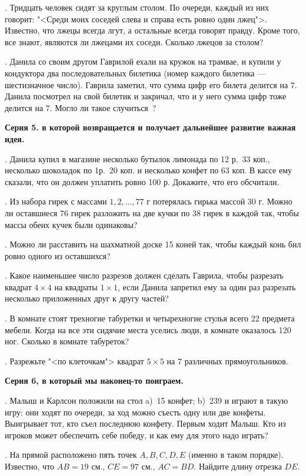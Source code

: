 . Тридцать человек сидят за круглым столом. По очереди, каждый из них говорит: "<Среди моих соседей слева и справа есть ровно один лжец">. 
Известно, что лжецы всегда лгут, а остальные всегда говорят правду. Кроме того, все знают, являются ли лжецами их соседи. 
Сколько лжецов за столом? 

. Данила со своим другом Гаврилой ехали на кружок на трамвае, и купили у
кондуктора два последовательных билетика (номер каждого билетика ---
шестизначное число). Гаврила заметил, что сумма цифр его билета делится на 7.
Данила посмотрел на свой билетик и закричал, что и у него сумма цифр тоже
делится на 7. Могло ли такое случиться~?

\centerline{\bf Серия 5. в которой возвращается и получает дальнейшее развитие 
важная идея.}

. Данила купил в магазине несколько бутылок лимонада по
12 р.~33 коп., несколько шоколадок по 1р.~20 коп. и несколько конфет по
63 коп.  В кассе ему сказали, что он должен уплатить ровно
100 р. Докажите, что его обсчитали.

. Из набора гирек с массами $1, 2, \ldots , 77$ г потерялась гирька
массой 30 г. Можно ли оставшиеся 76 гирек разложить на две кучки
по 38 гирек в каждой так, чтобы массы обеих кучек были одинаковы?

. Можно ли расставить на шахматной доске 15 коней так, чтобы каждый
конь бил ровно одного из оставшихся?

.  Какое наименьшее число разрезов должен сделать Гаврила, 
чтобы разрезать квадрат $4\times 4$ на квадраты $1\times 1$, 
если Данила запретил ему за один раз разрезать несколько приложенных 
друг к другу частей? 

. В комнате стоят трехногие табуретки и четырехногие стулья всего 22 
предмета мебели.
Когда на все эти сидячие места уселись люди, в комнате оказалось 120
ног. Сколько в комнате табуреток?

. Разрежьте "<по клеточкам"> квадрат $5\times 5$ на 7 различных прямоугольников.

\centerline{\bf Серия 6, в который мы наконец-то поиграем.}

. Малыш и Карлсон положили на стол a)~15 конфет; b)~239 и играют в такую игру:
они ходят по очереди, за ход можно съесть одну или две конфеты.
Выигрывает тот, кто съел последнюю конфету.
Первым ходит Малыш.
Кто из игроков может обеспечить себе победу, и как ему для этого
надо играть?

. На прямой расположено пять точек $A, B, C, D, E$ (именно в таком порядке).
Известно, что $AB=19$ см., $CE=97$ см., $AC=BD$. Найдите длину отрезка $DE$.

